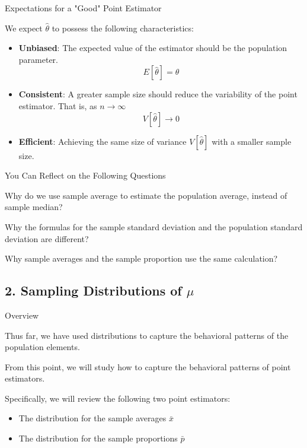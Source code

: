 \documentclass{beamer}
\begin{document}
\begin{frame}{Expectations for a "Good" Point Estimator}

We expect $\hat{\theta}$ to possess the following characteristics: 
\begin{itemize}
\item \textbf{Unbiased}: The expected value of the estimator should be the population parameter.
$$E\left[ \hat{\theta}\right]  = \theta $$
\item \textbf{Consistent}: A greater sample size should reduce the variability of the point estimator. That is, as $n \rightarrow \infty $
$$V\left[ \hat{\theta}\right] \rightarrow 0 $$ 
\item \textbf{Efficient}: Achieving the same size of variance $V\left[ \hat{\theta}\right]$ with a smaller sample size. 
\end{itemize}
\end{frame}




\begin{frame}{You Can Reflect on the Following Questions}

Why do we use sample average to estimate the population average, instead of sample median? 

\vspace{0.3 cm}
Why the formulas for the sample standard deviation and the population standard deviation are different? 

\vspace{0.3 cm}
Why sample averages and the sample proportion use the same calculation?

\end{frame}


\subsection{2. Sampling Distributions of $\mu$}
\begin{frame}
\subsectionpage
\end{frame}

\begin{frame}{Overview}

Thus far, we have used distributions to capture the behavioral patterns of the population elements. 

\vspace{0.3 cm}
From this point, we will study how to capture the behavioral patterns of point estimators. 

\vspace{0.3 cm}
Specifically, we will review the following two point estimators: 
\begin{itemize}
\item The distribution for the sample averages $\bar{x}$
\item The distribution for the sample proportions $\bar{p}$

\end{itemize}

\end{frame}
\end{document}
